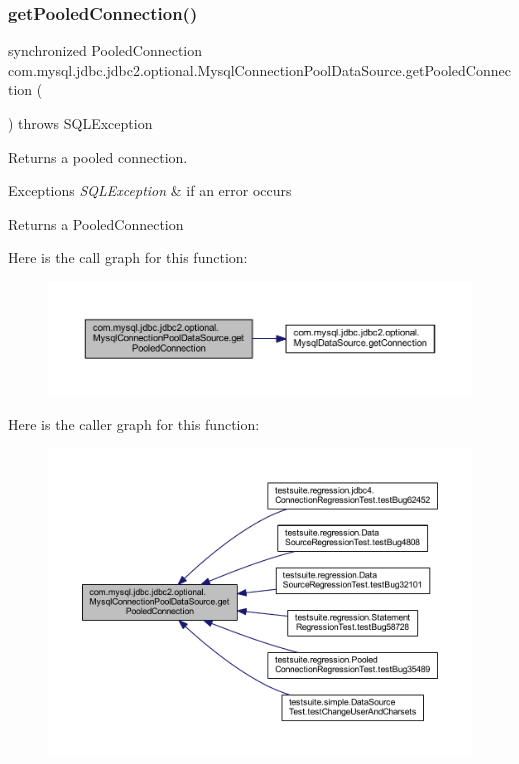 \subsubsection{\texorpdfstring{get\+Pooled\+Connection()}{getPooledConnection()}\hspace{0.1cm}{\footnotesize\ttfamily [1/2]}}
{\footnotesize\ttfamily synchronized Pooled\+Connection com.\+mysql.\+jdbc.\+jdbc2.\+optional.\+Mysql\+Connection\+Pool\+Data\+Source.\+get\+Pooled\+Connection (\begin{DoxyParamCaption}{ }\end{DoxyParamCaption}) throws S\+Q\+L\+Exception}

Returns a pooled connection.


\begin{DoxyExceptions}{Exceptions}
{\em S\+Q\+L\+Exception} & if an error occurs \\
\hline
\end{DoxyExceptions}
\begin{DoxyReturn}{Returns}
a Pooled\+Connection 
\end{DoxyReturn}
Here is the call graph for this function\+:
\nopagebreak
\begin{figure}[H]
\begin{center}
\leavevmode
\includegraphics[width=350pt]{classcom_1_1mysql_1_1jdbc_1_1jdbc2_1_1optional_1_1_mysql_connection_pool_data_source_a7ad70ccec5dcac093fe965c738ec484c_cgraph}
\end{center}
\end{figure}
Here is the caller graph for this function\+:
\nopagebreak
\begin{figure}[H]
\begin{center}
\leavevmode
\includegraphics[width=350pt]{classcom_1_1mysql_1_1jdbc_1_1jdbc2_1_1optional_1_1_mysql_connection_pool_data_source_a7ad70ccec5dcac093fe965c738ec484c_icgraph}
\end{center}
\end{figure}
